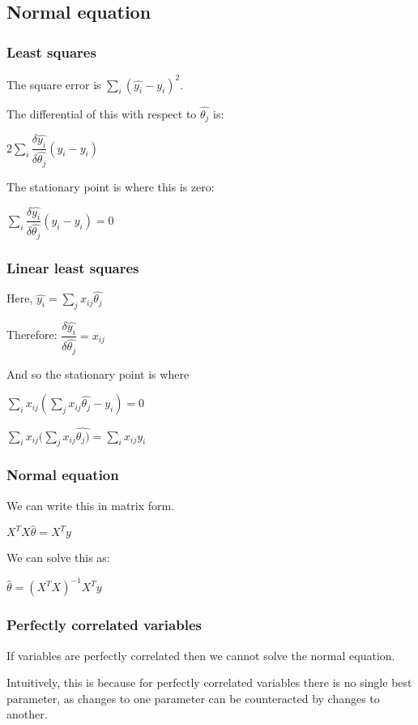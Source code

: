 
\subsection{Normal equation}

\subsubsection{Least squares}

The square error is \(\sum_i (\hat{y_i}-y_i)^2\).

The differential of this with respect to \(\hat{\theta_j }\) is:

\(2\sum_i \dfrac{\delta \hat{y_i}}{\delta \hat{\theta_j}}(\hat{y_i}-y_i)\)

The stationary point is where this is zero:

\(\sum_i \dfrac{\delta \hat{y_i}}{\delta \hat{\theta_j}}(\hat{y_i}-y_i)=0\)

\subsubsection{Linear least squares}

Here, \(\hat{y_i}= \sum_j x_{ij}\hat{\theta_j}\)

Therefore: \(\dfrac{\delta \hat{y_i}}{\delta \hat{\theta_j}}=x_{ij}\)

And so the stationary point is where

\(\sum_i x_{ij}( \sum_j x_{ij}\hat{\theta_j }-y_i)=0\)

\(\sum_i x_{ij}( \sum_j x_{ij}\hat{\theta_j)}= \sum_i x_{ij}y_i\)

\subsubsection{Normal equation}

We can write this in matrix form.

\(X^TX\hat{\theta }=X^Ty\)

We can solve this as:

\(\hat{\theta }=(X^TX)^{-1}X^Ty\)

\subsubsection{Perfectly correlated variables}

If variables are perfectly correlated then we cannot solve the normal equation.

Intuitively, this is because for perfectly correlated variables there is no single best parameter, as changes to one parameter can be counteracted by changes to another.

